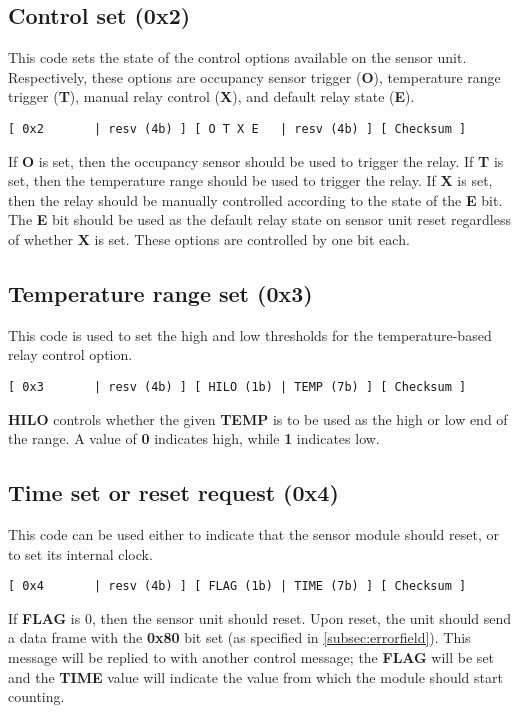 \documentclass[11pt]{article}
\begin{document}
\subsection{Control set (0x2)}
This code sets the state of the control options available on the sensor unit. Respectively, these options are occupancy sensor trigger (\textbf{O}), temperature range trigger (\textbf{T}), manual relay control (\textbf{X}), and default relay state (\textbf{E}).
\begin{verbatim}
[ 0x2       | resv (4b) ] [ O T X E   | resv (4b) ] [ Checksum ]
\end{verbatim}
If \textbf{O} is set, then the occupancy sensor should be used to trigger the relay. If \textbf{T} is set, then the temperature range should be used to trigger the relay. If \textbf{X} is set, then the relay should be manually controlled according to the state of the \textbf{E} bit. The \textbf{E} bit should be used as the default relay state on sensor unit reset regardless of whether \textbf{X} is set. These options are controlled by one bit each.

\subsection{Temperature range set (0x3)}
This code is used to set the high and low thresholds for the temperature-based relay control option.
\begin{verbatim}
[ 0x3       | resv (4b) ] [ HILO (1b) | TEMP (7b) ] [ Checksum ]
\end{verbatim}
\textbf{HILO} controls whether the given \textbf{TEMP} is to be used as the high or low end of the range. A value of \textbf{0} indicates high, while \textbf{1} indicates low.

\subsection{Time set or reset request (0x4)}
This code can be used either to indicate that the sensor module should reset, or to set its internal clock.
\begin{verbatim}
[ 0x4       | resv (4b) ] [ FLAG (1b) | TIME (7b) ] [ Checksum ]
\end{verbatim}
If \textbf{FLAG} is 0, then the sensor unit should reset. Upon reset, the unit should send a data frame with the \textbf{0x80} bit set (as specified in \ref{subsec:errorfield}). This message will be replied to with another control message; the \textbf{FLAG} will be set and the \textbf{TIME} value will indicate the value from which the module should start counting.
\end{document}
